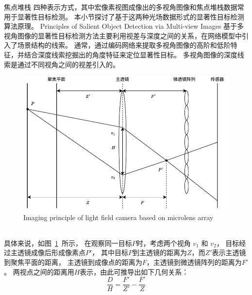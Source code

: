 焦点堆栈
四种表示方式，其中宏像素视图成像出的多视角图像和焦点堆栈数据常用于显著性目标检测。
本小节探讨了基于这两种光场数据形式的显著性目标检测算法原理。
%
%
{Principles of Salient Object Detection via Multi-view Images}
基于多视角图像的显著性目标检测方法主要利用视差与深度之间的关系，在网络模型中引入了场景结构的线索。
通常，通过编码网络来提取多视角图像的高阶和低阶特征，并结合深度线索挖掘出的角度特征来定位显著性目标。
多视角图像的深度线索是通过不同视角之间的视差引入的。
\begin{figure}[b]
	\centering
	\includegraphics[width=0.90\linewidth]{figures/chapter2/microlens_array_imaging.drawio}
	{Imaging principle of light field camera based on microlens array}  
	\label{cpt2_fig8:multi_array}
\end{figure}
\\
%
%
%
%
\indent
具体来说，如图~\ref{cpt2_fig8:multi_array}~所示，
在观察同一目标$P$时，考虑两个视角 $v_{1}$ 和 $v_{2}$，
目标经过主透镜成像后形成像素点$P'$，
其中目标$P$到主透镜的距离为$Z$，而$Z'$表示主透镜到聚焦平面的距离，
主透镜到成像点的距离为$F$，主透镜到微透镜阵列的距离为$F'$。
两视点之间的距离用$H$表示，由此可推导出如下几何关系：
%
%
\begin{equation}
	\frac{D}{H} = \frac{F'}{Z'} - \frac{F'}{Z} 
	\label{cpt2_fac1:relate}
\end{equation}
